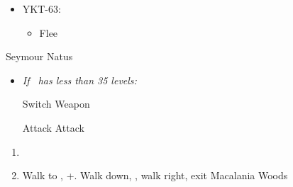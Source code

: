 \begin{encounters}
  \begin{itemize}
    \item YKT-63:
          \begin{itemize}
            \tidusf Attack
            \yunaf Attack
            \item Flee
          \end{itemize}
  \end{itemize}
\end{encounters}
\begin{battle}[36000]{Seymour Natus}
  \begin{itemize}
    \item \textit{If \lulu\ has less than 35 levels:}
          \begin{itemize}
            \switch{\tidus}{\lulu}
            \luluf Switch Weapon
            \switch{\lulu}{\tidus}
          \end{itemize}
          \tidusf Attack
          \summon{\bahamut}
          \bahamutf Attack
  \end{itemize}
\end{battle}
\begin{enumerate}[resume]
  \item \sd
  \item Walk to \yuna, \cs+\skippablefmv[10:10]. Walk down, \cs[1:40], walk right, exit Macalania Woods
\end{enumerate}